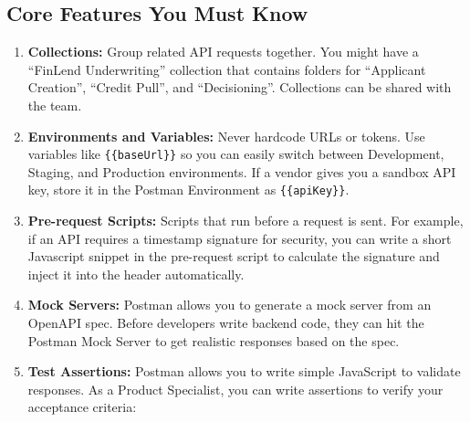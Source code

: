 \documentclass[
  11pt,
  openany,
  oneside]{book}
\providecommand{\tightlist}{%
  \setlength{\itemsep}{0pt}\setlength{\parskip}{0pt}}
\begin{document}
\subsection{Core Features You Must
Know}\label{core-features-you-must-know}

\begin{enumerate}
\def\labelenumi{\arabic{enumi}.}
\tightlist
\item
  \textbf{Collections:} Group related API requests together. You might
  have a ``FinLend Underwriting'' collection that contains folders for
  ``Applicant Creation'', ``Credit Pull'', and ``Decisioning''.
  Collections can be shared with the team.
\item
  \textbf{Environments and Variables:} Never hardcode URLs or tokens.
  Use variables like \texttt{\{\{baseUrl\}\}} so you can easily switch
  between Development, Staging, and Production environments. If a vendor
  gives you a sandbox API key, store it in the Postman Environment as
  \texttt{\{\{apiKey\}\}}.
\item
  \textbf{Pre-request Scripts:} Scripts that run before a request is
  sent. For example, if an API requires a timestamp signature for
  security, you can write a short Javascript snippet in the pre-request
  script to calculate the signature and inject it into the header
  automatically.
\item
  \textbf{Mock Servers:} Postman allows you to generate a mock server
  from an OpenAPI spec. Before developers write backend code, they can
  hit the Postman Mock Server to get realistic responses based on the
  spec.
\item
  \textbf{Test Assertions:} Postman allows you to write simple
  JavaScript to validate responses. As a Product Specialist, you can
  write assertions to verify your acceptance criteria:
\end{enumerate}
\end{document}

